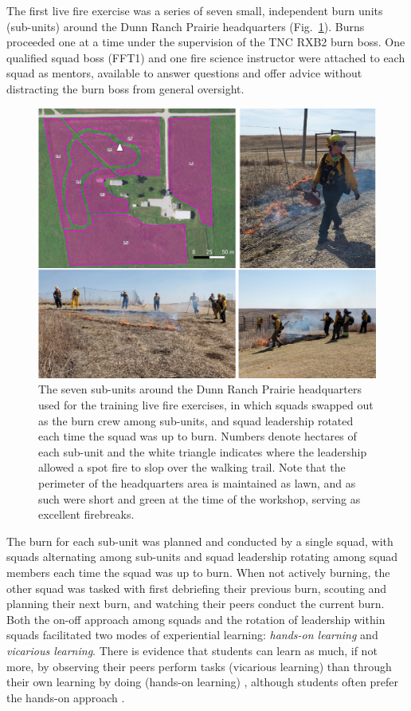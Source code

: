 \documentclass[fire,article,submit,moreauthors,pdftex]{Definitions/mdpi}
\begin{document}
The first live fire exercise was a series of seven small, independent burn units (sub-units) around the Dunn Ranch Prairie headquarters (Fig.~\ref{HQmap}).
Burns proceeded one at a time under the supervision of the TNC RXB2 burn boss.
One qualified squad boss (FFT1) and one fire science instructor were attached to each squad as mentors, available to answer questions and offer advice without distracting the burn boss from general oversight.

\begin{figure}
\centering
\includegraphics[width=1\columnwidth]{HQburns.pdf}
\caption{\label{HQmap}The seven sub-units around the Dunn Ranch Prairie headquarters used for the training live fire exercises, in which squads swapped out as the burn crew among sub-units, and squad leadership rotated each time the squad was up to burn. Numbers denote hectares of each sub-unit and the white triangle indicates where the leadership allowed a spot fire to slop over the walking trail. Note that the perimeter of the headquarters area is maintained as lawn, and as such were short and green at the time of the workshop, serving as excellent firebreaks.}
\end{figure}

The burn for each sub-unit was planned and conducted by a single squad, with squads alternating among sub-units and squad leadership rotating among squad members each time the squad was up to burn.
When not actively burning, the other squad was tasked with first debriefing their previous burn, scouting and planning their next burn, and watching their peers conduct the current burn.
Both the on-off approach among squads and the rotation of leadership within squads facilitated two modes of experiential learning: \emph{hands-on learning} and \emph{vicarious learning}.
There is evidence that students can learn as much, if not more, by observing their peers perform tasks (vicarious learning) than through their own learning by doing (hands-on learning) \citep{stegmann2012}, although students often prefer the hands-on approach \citep{reime2017}.
\end{document}
